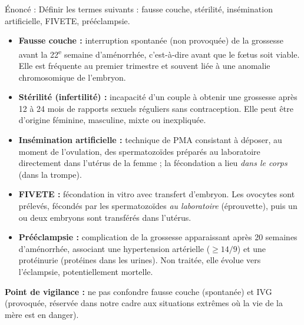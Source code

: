 \documentclass[11pt]{article}
\begin{document}
\begin{corrige}
Énoncé : Définir les termes suivants : fausse couche, stérilité, insémination artificielle, FIVETE, prééclampsie.
\tcblower
\begin{itemize}
\item \textbf{Fausse couche :} interruption spontanée (non provoquée) de la grossesse avant la 22\textsuperscript{e} semaine d'aménorrhée, c'est-à-dire avant que le fœtus soit viable. Elle est fréquente au premier trimestre et souvent liée à une anomalie chromosomique de l'embryon.
\item \textbf{Stérilité (infertilité) :} incapacité d'un couple à obtenir une grossesse après 12 à 24 mois de rapports sexuels réguliers sans contraception. Elle peut être d'origine féminine, masculine, mixte ou inexpliquée.
\item \textbf{Insémination artificielle :} technique de PMA consistant à déposer, au moment de l'ovulation, des spermatozoïdes préparés au laboratoire directement dans l'utérus de la femme ; la fécondation a lieu \emph{dans le corps} (dans la trompe).
\item \textbf{FIVETE :} fécondation in vitro avec transfert d'embryon. Les ovocytes sont prélevés, fécondés par les spermatozoïdes \emph{au laboratoire} (éprouvette), puis un ou deux embryons sont transférés dans l'utérus.
\item \textbf{Prééclampsie :} complication de la grossesse apparaissant après 20 semaines d'aménorrhée, associant une hypertension artérielle ($\ge 14/9$) et une protéinurie (protéines dans les urines). Non traitée, elle évolue vers l'éclampsie, potentiellement mortelle.
\end{itemize}
\textbf{Point de vigilance :} ne pas confondre fausse couche (spontanée) et IVG (provoquée, réservée dans notre cadre aux situations extrêmes où la vie de la mère est en danger).
\end{corrige}
\end{document}
